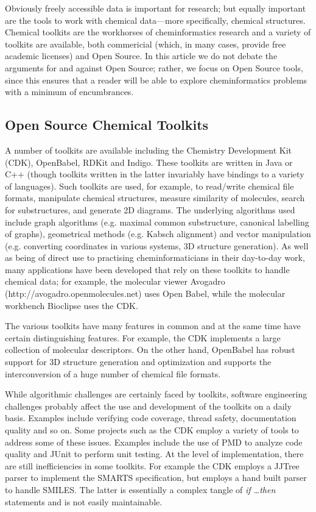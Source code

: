 \documentclass{sig-alternate}
\begin{document}
Obviously freely accessible data is important for research; but
equally important are the tools to work with chemical data---more
specifically, chemical structures. Chemical toolkits are the workhorses
of cheminformatics research and a variety of toolkits are available,
both commericial (which, in many cases, provide free academic
licenses) and Open Source. In this article we do not debate the
arguments for and against Open Source; rather, we focus on Open Source
tools, since this ensures that a reader will be able to explore
cheminformatics problems with a minimum of encumbrances.

\subsection{Open Source Chemical Toolkits}

A number of toolkits are available including the Chemistry Development
Kit (CDK), OpenBabel, RDKit and Indigo. These toolkits are written in
Java or C++ (though toolkits written in the latter invariably have
bindings to a variety of languages). Such toolkits are used, for
example, to read/write chemical file formats, manipulate chemical
structures, measure similarity of molecules, search for substructures,
and generate 2D diagrams. The underlying algorithms used include graph
algorithms (e.g. maximal common substructure, canonical labelling of
graphs), geometrical methods (e.g. Kabsch alignment) and vector
manipulation (e.g. converting coordinates in various systems, 3D
structure generation). As well as being of direct use to practising
cheminformaticians in their day-to-day work, many applications have
been developed that rely on these toolkits to handle chemical data;
for example, the molecular viewer Avogadro
(http://avogadro.openmolecules.net) uses Open Babel, while the
molecular workbench Bioclipse \cite{Bioclipse2} uses the CDK.

The various toolkits have many features in common and at the same time
have certain distinguishing features. For example, the CDK implements
a large collection of molecular descriptors. On the other hand,
OpenBabel has robust support for 3D structure generation and
optimization and supports the interconversion of a huge number of
chemical file formats.

While algorithmic challenges are certainly faced by toolkits, software
engineering challenges probably affect the use and development of the
toolkits on a daily basis. Examples include verifying code coverage,
thread safety, documentation quality and so on. Some projects such as
the CDK employ a variety of tools to address some of these issues.
Examples include the use of PMD to analyze code quality and JUnit to
perform unit testing. At the level of implementation, there are still
inefficiencies in some toolkits. For example the CDK employs a JJTree
parser to implement the SMARTS specification, but employs a hand built
parser to handle SMILES. The latter is essentially a complex tangle of
\emph{if \ldots then} statements and is not easily maintainable.
\end{document}
